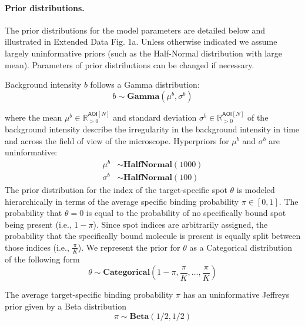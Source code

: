 \paragraph{Prior distributions.} The prior distributions for the model parameters are detailed below and illustrated in Extended Data Fig. 1a. Unless otherwise indicated we assume largely uninformative priors (such as the Half-Normal distribution with large mean). Parameters of prior distributions can be changed if necessary.

Background intensity $b$ follows a Gamma distribution:
%
\begin{equation}
    b \sim \mathbf{Gamma}(\mu^b, \sigma^b)
\end{equation}

\noindent
where the mean $\mu^b \in \mathbb{R}_{>0}^{\mathsf{AOI}[N]}$ and standard deviation $\sigma^b \in \mathbb{R}_{>0}^{\mathsf{AOI}[N]}$ of the background intensity describe the irregularity in the background intensity in time and across the field of view of the microscope. Hyperpriors for $\mu^b$ and $\sigma^b$ are uninformative:
%
\begin{subequations}
\begin{align}
    \mu^b &\sim \mathbf{HalfNormal}(1000) \\
    \sigma^b &\sim \mathbf{HalfNormal}(100)
\end{align}
\end{subequations}
%
The prior distribution for the index of the target-specific spot $\theta$ is modeled hierarchically in terms of the average specific binding probability $\pi \in [0, 1] $. The probability that $\theta = 0$ is equal to the probability of no specifically bound spot being present (i.e., $1-\pi$). Since spot indices are arbitrarily assigned, the probability that the specifically bound molecule is present is equally split between those indices (i.e., $\frac{\pi}{K}$). We represent the prior for $\theta$ as a Categorical distribution of the following form
%
\begin{equation}
    \theta \sim \mathbf{Categorical}\left(1 - \pi, \frac{\pi}{K}, \dots, \frac{\pi}{K}\right)
\end{equation}

The average target-specific binding probability $\pi$ has an uninformative Jeffreys prior given by a Beta distribution
%
\begin{equation}
    \pi \sim \mathbf{Beta}(1/2, 1/2)
\end{equation}


